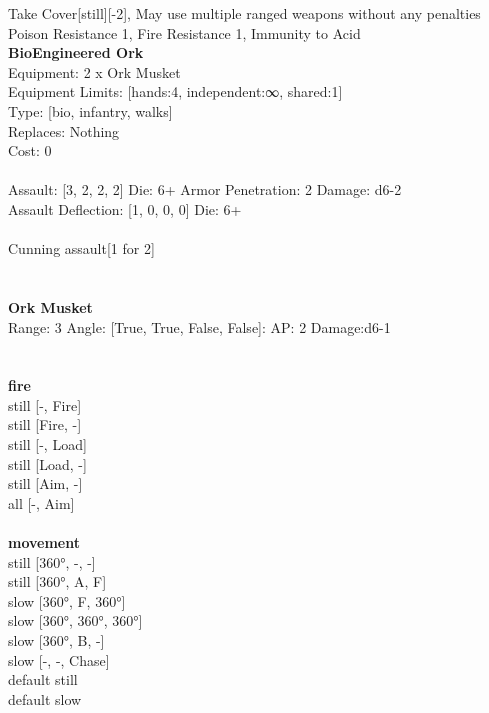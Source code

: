 \noindent Take Cover[still][-2], May use multiple ranged weapons without any penalties\\ 
Poison Resistance 1, Fire Resistance 1, Immunity to Acid\\ 


{\bf BioEngineered Ork } \\
Equipment: 2 x Ork Musket \\
Equipment Limits: [hands:4, independent:∞, shared:1] \\
Type: [bio, infantry, walks] \\
Replaces: Nothing \\
Cost: 0\\
\ \\
Assault: [3, 2, 2, 2] Die: 6+ Armor Penetration: 2 Damage: d6-2 \\
Assault Deflection: [1, 0, 0, 0] Die: 6+\\
\\ 
Cunning assault[1 for 2]\\ 
 
\ \\

\ \\
{\bf Ork Musket } \\



Range: 3  Angle: [True, True, False, False]: AP: 2 Damage:d6-1 \\




 
\ \\



\ \\ {\bf fire } \\
still [-, Fire] \\
still [Fire, -] \\
still [-, Load] \\
still [Load, -] \\
still [Aim, -] \\
all [-, Aim] \\
\ \\ {\bf movement } \\
still [360°, -, -] \\
still [360°, A, F] \\
slow [360°, F, 360°] \\
slow [360°, 360°, 360°] \\
slow [360°, B, -] \\
slow [-, -, Chase] \\
default still \\
default slow \\


